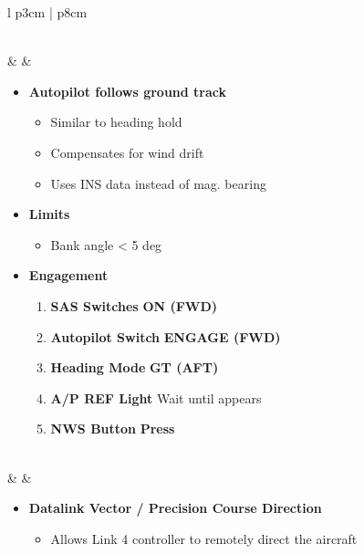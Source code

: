 \documentclass[8pt,usenames,dvipsnames,twoside]{article}
\begin{document}
\begin{center}
\begin{longtable}{l p{3cm} | p{8cm}}
\begin{minipage}[t]{\linewidth}
\begin{itemize}
\begin{enumerate}[label=(\alph*)]
						\end{enumerate} 
					\end{itemize}
				\end{minipage} \\
				\midrule 
				\textbullet &  & 
				\begin{minipage}[t]{\linewidth}
					\vspace{-7pt}
					\begin{itemize}
						\item \textbf{Autopilot follows ground track} 
						\begin{itemize}
							\item Similar to heading hold
							\item Compensates for wind drift
							\item Uses INS data instead of mag. bearing
						\end{itemize}
						\item \textbf{Limits}
						\begin{itemize}
							\item Bank angle < 5 deg
						\end{itemize}
						\item \textbf{Engagement}
						\begin{enumerate}[label=(\alph*)]
							\item \textbf{SAS Switches} \dotfill \textbf{ON (FWD)}
							\item \textbf{Autopilot Switch} \dotfill \textbf{ENGAGE (FWD)}
							\item \textbf{Heading Mode} \dotfill \textbf{GT (AFT)}
							\item \textbf{A/P REF Light} \dotfill Wait until appears
							\item \textbf{NWS Button} \dotfill \textbf{Press}
						\end{enumerate} 
					\end{itemize}
				\end{minipage} \\
				\midrule 
				\textbullet &  & 
				\begin{minipage}[t]{\linewidth}
					\vspace{-7pt}
					\begin{itemize}
						\item \textbf{Datalink Vector / Precision Course Direction} 
						\begin{itemize}
							\item Allows Link 4 controller to remotely direct the aircraft

\end{itemize}
\end{itemize}
\end{minipage}
\end{longtable}
\end{center}
\end{document}
